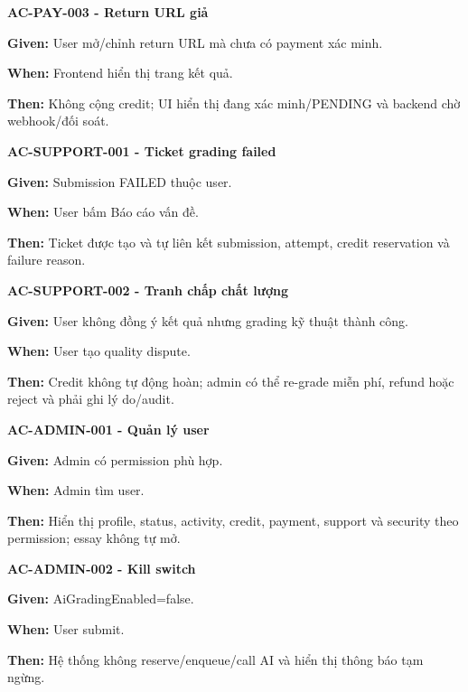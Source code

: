 \documentclass[11pt,a4paper]{article}
\begin{document}
\begin{acceptancebox}
\textbf{AC-PAY-003 - Return URL giả}\par
\textbf{Given:} User mở/\allowbreak{}chỉnh return URL mà chưa có payment xác minh.\par
\textbf{When:} Frontend hiển thị trang kết quả.\par
\textbf{Then:} Không cộng credit; UI hiển thị đang xác minh/\allowbreak{}PENDING và backend chờ webhook/\allowbreak{}đối soát.
\end{acceptancebox}

\begin{acceptancebox}
\textbf{AC-SUPPORT-001 - Ticket grading failed}\par
\textbf{Given:} Submission FAILED thuộc user.\par
\textbf{When:} User bấm Báo cáo vấn đề.\par
\textbf{Then:} Ticket được tạo và tự liên kết submission, attempt, credit reservation và failure reason.
\end{acceptancebox}

\begin{acceptancebox}
\textbf{AC-SUPPORT-002 - Tranh chấp chất lượng}\par
\textbf{Given:} User không đồng ý kết quả nhưng grading kỹ thuật thành công.\par
\textbf{When:} User tạo quality dispute.\par
\textbf{Then:} Credit không tự động hoàn; admin có thể re-grade miễn phí, refund hoặc reject và phải ghi lý do/\allowbreak{}audit.
\end{acceptancebox}

\begin{acceptancebox}
\textbf{AC-ADMIN-001 - Quản lý user}\par
\textbf{Given:} Admin có permission phù hợp.\par
\textbf{When:} Admin tìm user.\par
\textbf{Then:} Hiển thị profile, status, activity, credit, payment, support và security theo permission; essay không tự mở.
\end{acceptancebox}

\begin{acceptancebox}
\textbf{AC-ADMIN-002 - Kill switch}\par
\textbf{Given:} AiGradingEnabled=false.\par
\textbf{When:} User submit.\par
\textbf{Then:} Hệ thống không reserve/\allowbreak{}enqueue/\allowbreak{}call AI và hiển thị thông báo tạm ngừng.
\end{acceptancebox}
\end{document}
